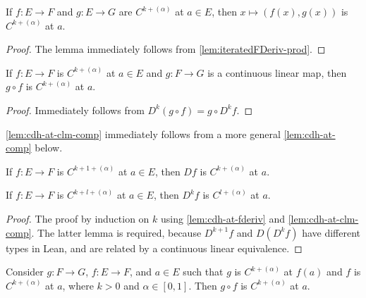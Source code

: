 \begin{lemma}%
  \label{lem:cdh-at-prodMk}
  If \(f \colon E \to F\) and \(g \colon E \to G\) are \(C^{k+(\alpha)}\) at \(a \in E\),
  then \(x \mapsto (f(x), g(x))\) is \(C^{k+(\alpha)}\) at \(a\).
\end{lemma}
\begin{proof}
  The lemma immediately follows from \autoref{lem:iteratedFDeriv-prod}.
\end{proof}

\begin{lemma}%
  \label{lem:cdh-at-clm-comp}
  If \(f \colon E \to F\) is \(C^{k+(\alpha)}\) at \(a \in E\)
  and \(g \colon F \to G\) is a continuous linear map,
  then \(g \circ f\) is \(C^{k+(\alpha)}\) at \(a\).
\end{lemma}

\begin{proof}
  Immediately follows from \(D^{k}(g \circ f) = g\circ D^{k}f\).
\end{proof}

\begin{remark}
  \autoref{lem:cdh-at-clm-comp} immediately follows from a more general \autoref{lem:cdh-at-comp} below.
\end{remark}

\begin{lemma}%
  \label{lem:cdh-at-fderiv}
  If \(f \colon E \to F\) is \(C^{k+1+(\alpha)}\) at \(a \in E\),
  then \(Df\) is \(C^{k+(\alpha)}\) at \(a\).
\end{lemma}

\begin{corollary}%
  \label{lem:cdh-at-iteratedFDeriv}
  If \(f \colon E \to F\) is \(C^{k+l+(\alpha)}\) at \(a \in E\),
  then \(D^{k}f\) is \(C^{l+(\alpha)}\) at \(a\).
\end{corollary}
\begin{proof}
  The proof by induction on \(k\) using \autoref{lem:cdh-at-fderiv} and \autoref{lem:cdh-at-clm-comp}.
  The latter lemma is required, because \(D^{k+1}f\) and \(D(D^{k} f)\) have different types in Lean,
  and are related by a continuous linear equivalence.
\end{proof}

\begin{lemma}%
  \label{lem:cdh-at-comp}
  Consider \(g\colon F \to G\), \(f\colon E \to F\), and \(a \in E\)
  such that \(g\) is \(C^{k+(\alpha)}\) at \(f(a)\) and \(f\) is \(C^{k+(\alpha)}\) at \(a\), where \(k > 0\) and \(\alpha \in [0, 1]\).
  Then \(g\circ f\) is \(C^{k+(\alpha)}\) at \(a\).
\end{lemma}

